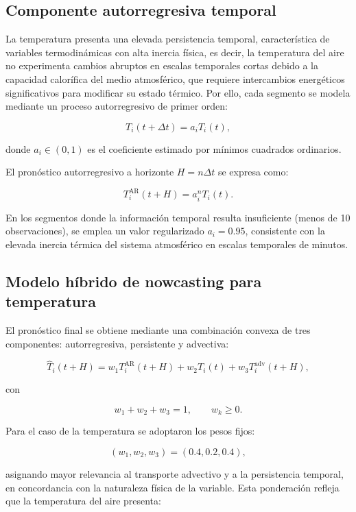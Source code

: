 \documentclass[
  spanish,
  us-letterpaper,
]{scrreprt}
\numberwithin{equation}{section}
\begin{document}
\subsection{Componente autorregresiva
temporal}\label{componente-autorregresiva-temporal-1}

La temperatura presenta una elevada persistencia temporal,
característica de variables termodinámicas con alta inercia física, es
decir, la temperatura del aire no experimenta cambios abruptos en
escalas temporales cortas debido a la capacidad calorífica del medio
atmosférico, que requiere intercambios energéticos significativos para
modificar su estado térmico. Por ello, cada segmento se modela mediante
un proceso autorregresivo de primer orden:

\[
T_i(t+\Delta t) = a_i T_i(t),
\]

donde \(a_i \in (0,1)\) es el coeficiente estimado por mínimos cuadrados
ordinarios.

El pronóstico autorregresivo a horizonte \(H = n\Delta t\) se expresa
como:

\[
T_i^{\text{AR}}(t+H) = a_i^{n} T_i(t).
\]

En los segmentos donde la información temporal resulta insuficiente
(menos de 10 observaciones), se emplea un valor regularizado
\(a_i = 0.95\), consistente con la elevada inercia térmica del sistema
atmosférico en escalas temporales de minutos.

\subsection{Modelo híbrido de nowcasting para
temperatura}\label{modelo-huxedbrido-de-nowcasting-para-temperatura}

El pronóstico final se obtiene mediante una combinación convexa de tres
componentes: autorregresiva, persistente y advectiva:

\[
\hat{T}_i(t+H) = w_1 T_i^{\text{AR}}(t+H) + w_2 T_i(t) + w_3 T_i^{\text{adv}}(t+H),
\]

con

\[
w_1 + w_2 + w_3 = 1, \qquad w_k \ge 0.
\]

Para el caso de la temperatura se adoptaron los pesos fijos:

\[
(w_1, w_2, w_3) = (0.4, 0.2, 0.4),
\]

asignando mayor relevancia al transporte advectivo y a la persistencia
temporal, en concordancia con la naturaleza física de la variable. Esta
ponderación refleja que la temperatura del aire presenta:
\end{document}

